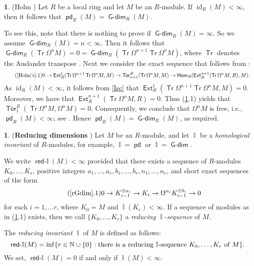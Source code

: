 \documentclass{amsart}
\DeclareMathOperator{\Hdim}{\operatorname{\mathbf{\mathbb{I}}}}
\DeclareMathOperator{\rHdim}{\operatorname{\mathsf{red-\mathbb{I}}}}
\theoremstyle{plain} %
\theoremstyle{definition}
\newtheorem{chunk}[thm]{\hspace*{-1.065ex}\bf}
\newcommand{\NN}{\mathbb{N}}
\DeclareMathOperator{\id}{id}
\def\Tor{\operatorname{\mathsf{Tor}}}
\def\Ext{\operatorname{\mathsf{Ext}}}
\def\Hom{\operatorname{\mathsf{Hom}}}
\def\pd{\operatorname{\mathsf{pd}}}
\def\Tr{\operatorname{\mathsf{Tr}}}
\DeclareMathOperator{\Gdim}{\mathsf{G-dim}}
\begin{document}
\begin{chunk} (Holm \cite[2.2]{Holm}) \label{Holm's} Let $R$ be a local ring and let $M$ be an $R$-module. If $\id_R(M)<\infty$, then it follows that $\pd_R(M)=\Gdim_R(M)$.

To see this, note that there is nothing to prove if $\Gdim_R(M)=\infty$. So we assume $\Gdim_R(M)=n<\infty$. Then it follows that $\Gdim_R(\Tr \Omega^n M)=0=\Gdim_R(\Tr \Omega^{n+1} \Tr \Omega^n M)$, where $\Tr$ denotes the Auslander transpose \cite{AuBr}. Next we consider the exact sequence that follows from \cite[2.8]{AuBr}:
\begin{equation}\tag{\ref{Holm's}.1}
0\rightarrow\Ext^1_R(\Tr \Omega^{n+1} \Tr \Omega^n M,M) \rightarrow \Tor_{n+1}^R(\Tr \Omega^n M,M)\rightarrow
\Hom_R(\Ext^{n+1}_R(\Tr \Omega^n M,R),M).
\end{equation}
As $\id_R(M)<\infty$, it follows from \ref{Isc} that $\Ext^1_R(\Tr \Omega^{n+1} \Tr \Omega^n M,M)=0$.
Moreover, we have that $\Ext^{n+1}_R(\Tr \Omega^n M,R)=0$. Thus (\ref{Holm's}.1) yields that $\Tor_1^R(\Tr \Omega^n M,\Omega^nM)=0$.
Consequently, we conclude that $\Omega^n M$ is free, i.e., $\pd_R(M)<\infty$; see \cite[3.9]{Yo}. Hence $\pd_R(M)=\Gdim_R(M)$, as required. \pushQED{\qed} 
\qedhere
\popQED	
\end{chunk}


\begin{chunk} \label{rGdim} (\textbf{Reducing dimensions} \cite[2.1]{CA}) Let $M$ be an $R$-module, and let $\Hdim$ be a \emph{homological invariant} of $R$-modules, for example, $\Hdim=\pd$ or $\Hdim=\Gdim$.

We write $\rHdim(M)<\infty$ provided that there exists a sequence of $R$-modules $K_0,  \ldots, K_r$, positive integers $a_1, \dots, a_r,b_1, \dots, b_r ,n_1, \dots, n_r$, and short exact sequences of the form 
\begin{equation}\tag{\ref{rGdim}.1}
0 \to K_{i-1}^{{\oplus a_i}} \to K_{i} \to \Omega^{n_i}K_{i-1}^{{\oplus b_i}} \to 0
\end{equation}
for each $i=1, \ldots r$, where $K_0=M$ and $\Hdim(K_r)<\infty$. If a sequence of modules as in (\ref{rGdim}.1) exists, then we call $\{K_0,  \ldots, K_r\}$ a \emph{reducing $\Hdim$-sequence} of $M$. 

The \emph{reducing invariant} $\Hdim$ of $M$ is defined as follows:
\begin{equation}\notag{}
\rHdim(M)=\inf\{ r\in \NN \cup \{0\}: \text{there is a reducing $\Hdim$-sequence }  K_0,  \ldots, K_r \text{ of }  M\}.
\end{equation}
We set, $\rHdim(M)=0$ if and only if $\Hdim(M)<\infty$. \pushQED{\qed} 
\qedhere
\popQED	
\end{chunk}
\end{document}
